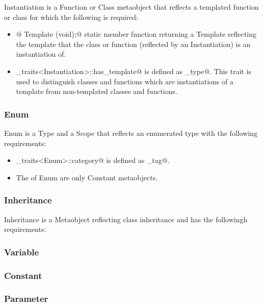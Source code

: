 {\metaobject Instantiation} is a {\metaobject Function} or {\metaobject Class} metaobject
that reflects a templated function or class for which the following is required:

\begin{itemize}

	\item{\verb@static @ {\metaobject Template} \verb@model(void);@} static member function returning
	a {\metaobject Template} reflecting the template that the class or function 
	(reflected by an {\metaobject Instantiation}) is an instantiation of.

	\item \verb@metaobject_traits<Instantiation>::has_template@ is defined as \verb@true_type@.
	This trait is used to distinguish classes and functions which are instantiations
	of a template from non-templated classes and functions.
\end{itemize}

\subsubsection{Enum}

{\metaobject Enum} is a {\metaobject Type} and a {\metaobject Scope} that reflects an enumerated
type with the following requirements:

\begin{itemize}
	\item \verb@metaobject_traits<Enum>::category@ is defined as \verb@enum_tag@.

	\item The \verb@members@ of {\metaobject Enum} are only {\metaobject Constant} metaobjects.
\end{itemize}

\subsubsection{Inheritance}

{\metaobject Inheritance} is a {\metaobject Metaobject} reflecting class inheritance and has
the followingh requirements:

\subsubsection{Variable}

\subsubsection{Constant}

\subsubsection{Parameter}

